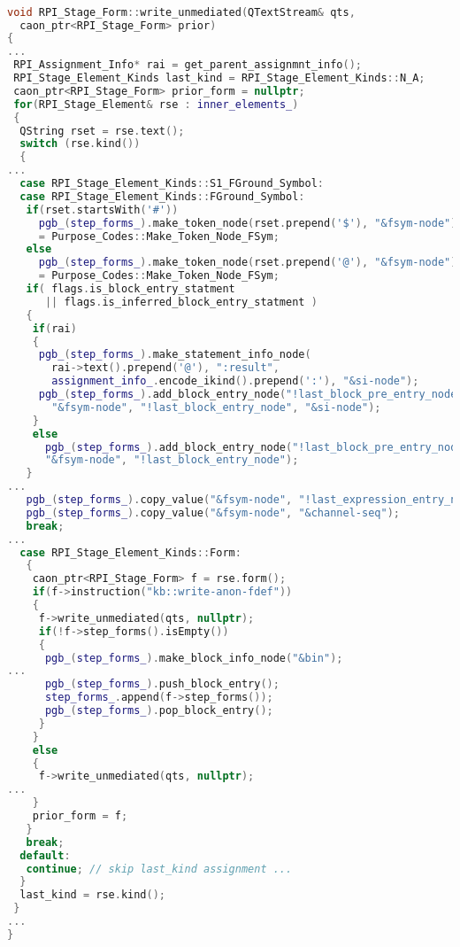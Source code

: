 \begin{lstlisting}[language = C++, numbers = none,
caption={Hypergraph IR Builder},label={lst:figPGB}, 
    basicstyle = \ttfamily\bfseries\tiny, linewidth = .95\linewidth] 

void RPI_Stage_Form::write_unmediated(QTextStream& qts, 
  caon_ptr<RPI_Stage_Form> prior)
{
...
 RPI_Assignment_Info* rai = get_parent_assignmnt_info();
 RPI_Stage_Element_Kinds last_kind = RPI_Stage_Element_Kinds::N_A;
 caon_ptr<RPI_Stage_Form> prior_form = nullptr;
 for(RPI_Stage_Element& rse : inner_elements_)
 {
  QString rset = rse.text();
  switch (rse.kind())
  {
...
  case RPI_Stage_Element_Kinds::S1_FGround_Symbol:
  case RPI_Stage_Element_Kinds::FGround_Symbol:
   if(rset.startsWith('#'))
     pgb_(step_forms_).make_token_node(rset.prepend('$'), "&fsym-node")
     = Purpose_Codes::Make_Token_Node_FSym;
   else
     pgb_(step_forms_).make_token_node(rset.prepend('@'), "&fsym-node")
     = Purpose_Codes::Make_Token_Node_FSym;
   if( flags.is_block_entry_statment
      || flags.is_inferred_block_entry_statment )
   {
    if(rai)
    {
     pgb_(step_forms_).make_statement_info_node(
       rai->text().prepend('@'), ":result",
       assignment_info_.encode_ikind().prepend(':'), "&si-node");
     pgb_(step_forms_).add_block_entry_node("!last_block_pre_entry_node",
       "&fsym-node", "!last_block_entry_node", "&si-node");
    }
    else
      pgb_(step_forms_).add_block_entry_node("!last_block_pre_entry_node",
      "&fsym-node", "!last_block_entry_node");
   }
...
   pgb_(step_forms_).copy_value("&fsym-node", "!last_expression_entry_node");
   pgb_(step_forms_).copy_value("&fsym-node", "&channel-seq");
   break;
...
  case RPI_Stage_Element_Kinds::Form:
   {
    caon_ptr<RPI_Stage_Form> f = rse.form();
    if(f->instruction("kb::write-anon-fdef"))
    {
     f->write_unmediated(qts, nullptr);
     if(!f->step_forms().isEmpty())
     {
      pgb_(step_forms_).make_block_info_node("&bin");
...
      pgb_(step_forms_).push_block_entry();
      step_forms_.append(f->step_forms());
      pgb_(step_forms_).pop_block_entry();
     }
    }
    else
    {
     f->write_unmediated(qts, nullptr);
...
    }
    prior_form = f;
   }
   break;
  default:
   continue; // skip last_kind assignment ...
  }
  last_kind = rse.kind();
 }
...
}


\end{lstlisting}
